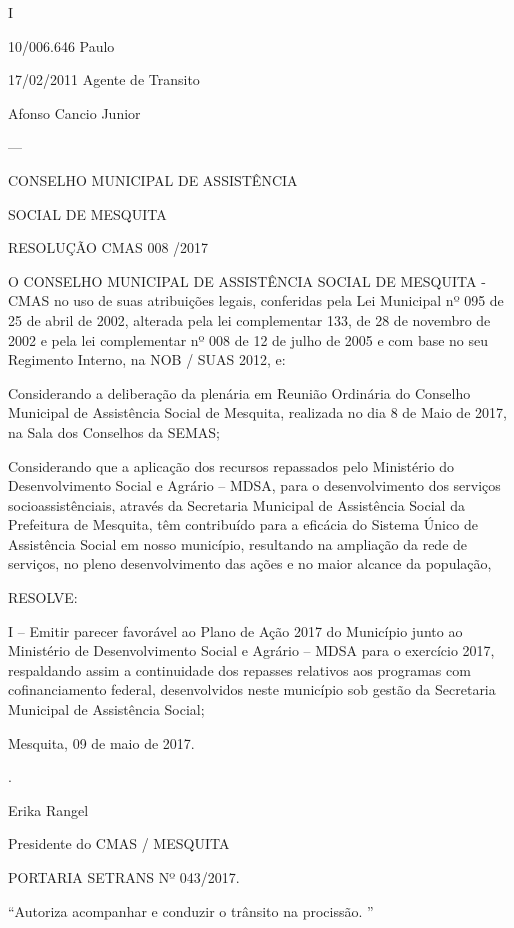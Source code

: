 \documentclass{doliberto}
\begin{document}
I 

10/006.646  Paulo 

17/02/2011  Agente de Transito 

Afonso 
Cancio 
Junior 


---

CONSELHO MUNICIPAL DE ASSISTÊNCIA 

SOCIAL DE MESQUITA 

RESOLUÇÃO CMAS 008 /2017 

 
O  CONSELHO  MUNICIPAL  DE  ASSISTÊNCIA  SOCIAL  DE 
MESQUITA  -  CMAS  no  uso  de  suas  atribuições  legais, 
conferidas pela Lei Municipal nº 095 de 25 de abril de 2002, 
alterada pela lei complementar 133, de 28 de novembro de 
2002 e pela lei complementar nº 008 de 12 de julho de 2005 
e com base no seu Regimento Interno, na NOB / SUAS 2012, 
e:  
 

Considerando  a  deliberação  da  plenária  em  Reunião 
Ordinária  do  Conselho  Municipal  de  Assistência  Social  de 
Mesquita,  realizada  no  dia  8  de  Maio  de  2017,  na  Sala  dos 
Conselhos da SEMAS;  
 
Considerando que a aplicação dos recursos repassados pelo 
Ministério  do  Desenvolvimento  Social  e  Agrário  –  MDSA, 
para  o  desenvolvimento  dos  serviços  socioassistênciais, 
através  da  Secretaria  Municipal  de  Assistência  Social  da 
Prefeitura  de  Mesquita,  têm  contribuído  para  a  eficácia  do 
Sistema  Único  de  Assistência  Social  em  nosso  município, 
resultando  na  ampliação  da  rede  de  serviços,  no  pleno 
desenvolvimento das ações e no maior alcance da população,  
 
RESOLVE: 
 
I  –  Emitir  parecer  favorável  ao  Plano  de  Ação  2017  do 
Município junto ao Ministério de Desenvolvimento Social e 
Agrário – MDSA para o exercício 2017, respaldando assim a 
continuidade  dos  repasses  relativos  aos  programas  com 
cofinanciamento federal, desenvolvidos neste município sob  
gestão da Secretaria Municipal de Assistência Social;  
 
Mesquita, 09 de maio de 2017.  
 
 
.  

Erika Rangel 

Presidente do CMAS / MESQUITA 

 

PORTARIA SETRANS Nº 043/2017.                           
 
 

“Autoriza acompanhar e conduzir o trânsito na procissão. ”  
\end{document}
